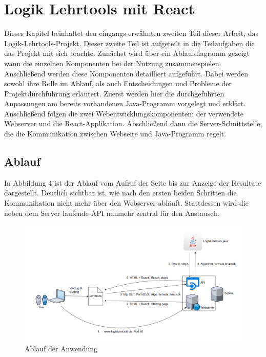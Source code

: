 
\chapter{Logik Lehrtools mit React}\label{Lehrtools}
Dieses Kapitel beinhaltet den eingangs erwähnten zweiten Teil dieser Arbeit, das Logik-Lehrtools-Projekt. Dieser zweite Teil ist aufgeteilt in die Teilaufgaben die das Projekt mit sich brachte. Zunächst wird über ein Ablaufdiagramm gezeigt wann die einzelnen Komponenten bei der Nutzung zusammenspielen. Anschließend werden diese Komponenten detailliert aufgeführt. Dabei werden sowohl ihre Rolle im Ablauf, als auch Entscheidungen und Probleme der Projektdurchführung erläutert. Zuerst werden hier die durchgeführten Anpassungen am bereits vorhandenen Java-Programm vorgelegt und erklärt. Anschließend folgen die zwei Webentwicklungskomponenten: der verwendete Webserver und die React-Applikation. Abschließend dann die Server-Schnittstelle, die die Kommunikation zwischen Webseite und Java-Programm regelt.
\pagebreak
\section{Ablauf}
In Abbildung 4 ist der Ablauf vom Aufruf der Seite bis zur Anzeige der Resultate dargestellt. Deutlich sichtbar ist, wie nach den ersten beiden Schritten die Kommunikation nicht mehr über den Webserver abläuft. Stattdessen wird die neben dem Server laufende API nunmehr zentral für den Austausch.
\begin{figure}[H]
     \centerline{\includegraphics[width=15cm]{../Abbildungen/AblaufLehrtools.png}}
  \caption{Ablauf der Anwendung}
  \label{fig1_1}
\end{figure}
